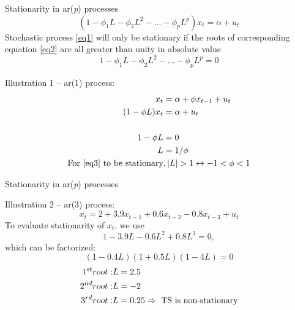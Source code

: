 \documentclass{beamer}
\begin{document}
\begin{frame}{Stationarity in ar(\textit{p}) processes}
\vspace{-0.5cm}
\begin{equation} \label{eq1}
(1-\phi_1 L - \phi_2 L^2 - \dots - \phi_p L^p)x_t = \alpha + u_t
\end{equation}
Stochastic process \eqref{eq1} will only be stationary if the roots of corresponding equation \eqref{eq2}  are all greater than unity in absolute value 
\begin{equation} \label{eq2}
1-\phi_1 L - \phi_2 L^2 - \dots - \phi_p L^p = 0
\end{equation}
\vspace{-0.5cm}
\begin{block}{Illustration 1 -- ar(1) process:}
\vspace{-0.5cm}
\begin{align}
\vspace{-0.5cm}
x_t & =  \alpha + \phi x_{t-1} + u_t \label{eq3}  \\ \nonumber
(1-\phi L) x_t & =  \alpha + u_t\\ \nonumber
~ \\ \nonumber
1- \phi L & = 0 \\ \nonumber
L & = 1/\phi \\ \nonumber
\textnormal{For \eqref{eq3} to be stationary} &, \textnormal{$|L|>1 \leftrightarrow -1 < \phi < 1$}
\end{align}
\end{block}
\end{frame}
\begin{frame}{Stationarity in ar(\textit{p}) processes}
\begin{block}{Illustration 2 -- ar(3) process:}
\begin{equation*}
x_t   = 2 + 3.9 x_{t-1} + 0.6 x_{t-2} - 0.8 x_{t-3} + u_t 
\end{equation*}
To evaluate stationarity of $x_t$, we use
\begin{equation*}
1-3.9 L - 0.6 L^2 + 0.8 L^3  = 0 , 
\end{equation*}
which can be factorized:
$$ (1-0.4L)(1+0.5L)(1-4L) =0 $$
\vspace{-0.5cm}
\begin{align} \notag
1^{st} root: & L = 2.5 \\ \notag
2^{nd} root: & L =-2 \\ \notag
3^{rd} root: & L = 0.25 \Rightarrow  \textnormal{~TS  is non-stationary}
\end{align}
\end{block}
\end{frame}
\end{document}
